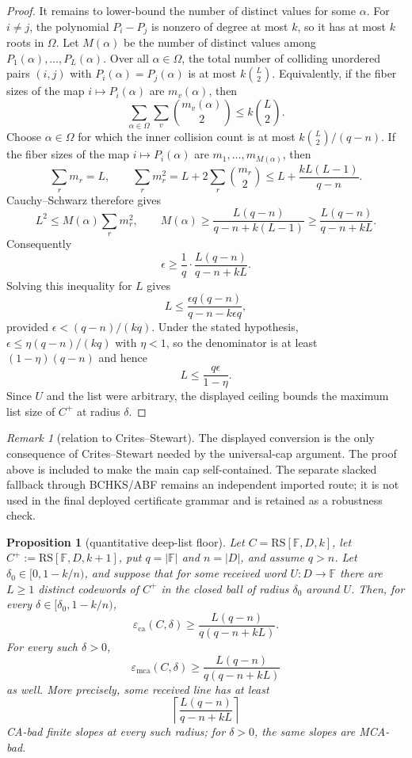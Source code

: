 \documentclass[11pt]{article}
\newtheorem{proposition}[proposition]{Proposition}
\theoremstyle{definition}
\theoremstyle{remark}
\newtheorem{remark}[remark]{Remark}
\newcommand{\F}{\mathbb{F}}
\newcommand{\RS}{\mathrm{RS}}
\newcommand{\eca}{\varepsilon_{\mathrm{ca}}}
\newcommand{\emca}{\varepsilon_{\mathrm{mca}}}
\begin{document}
\begin{proof}
It remains to lower-bound the number of distinct values for some
$\alpha$.  For $i\ne j$, the polynomial $P_i-P_j$ is nonzero of degree
at most $k$, so it has at most $k$ roots in $\Omega$.  Let $M(\alpha)$
be the number of distinct values among $P_1(\alpha),\ldots,P_L(\alpha)$.
Over all $\alpha\in\Omega$, the total number of colliding unordered pairs
$(i,j)$ with $P_i(\alpha)=P_j(\alpha)$ is at most $k\binom L2$.
Equivalently, if the fiber sizes of the map $i\mapsto P_i(\alpha)$ are
$m_v(\alpha)$, then
\[
        \sum_{\alpha\in\Omega}\sum_v \binom{m_v(\alpha)}2
        \le k\binom L2 .
\]
Choose $\alpha\in\Omega$ for which the inner collision count is at most
$k\binom L2/(q-n)$.  If the fiber sizes of the map $i\mapsto P_i(\alpha)$ are
$m_1,\ldots,m_{M(\alpha)}$, then
\[
        \sum_r m_r=L,
        \qquad
        \sum_r m_r^2=L+2\sum_r\binom{m_r}{2}
        \le L+\frac{kL(L-1)}{q-n}.
\]
Cauchy--Schwarz therefore gives
\[
        L^2\le M(\alpha)\sum_r m_r^2,
        \qquad
        M(\alpha)\ge
        \frac{L(q-n)}{q-n+k(L-1)}
        \ge
        \frac{L(q-n)}{q-n+kL} .
\]
Consequently
\[
        \epsilon
        \ge
        \frac1q\cdot \frac{L(q-n)}{q-n+kL}.
\]
Solving this inequality for $L$ gives
\[
        L
        \le
        \frac{\epsilon q(q-n)}{q-n-k\epsilon q},
\]
provided $\epsilon<(q-n)/(kq)$.  Under the stated hypothesis,
$\epsilon\le\eta(q-n)/(kq)$ with $\eta<1$, so the denominator is at
least $(1-\eta)(q-n)$ and hence
\[
        L\le \frac{q\epsilon}{1-\eta}.
\]
Since $U$ and the list were arbitrary, the displayed ceiling bounds the
maximum list size of $C^+$ at radius $\delta$.
\end{proof}

\begin{remark}[relation to Crites--Stewart]
The displayed conversion is the only consequence of Crites--Stewart
needed by the universal-cap argument.  The proof above is included to make the main cap
self-contained.  The separate slacked fallback through BCHKS/ABF remains
an independent imported route; it is not used in the final deployed certificate
grammar and is retained as a robustness check.
\end{remark}

\begin{proposition}[quantitative deep-list floor]
\label{prop:quantitative-deep-list-floor}
Let $C=\RS[\F,D,k]$, let $C^+:=\RS[\F,D,k+1]$, put
$q=|\F|$ and $n=|D|$, and assume $q>n$.  Let
$\delta_0\in[0,1-k/n)$, and suppose that for some received word
$U:D\to\F$ there are $L\ge1$ distinct codewords of $C^+$ in the
closed ball of radius $\delta_0$ around $U$.  Then, for every
$\delta\in[\delta_0,1-k/n)$,
\[
        \eca(C,\delta)
        \ge
        \frac{L(q-n)}{q(q-n+kL)} .
\]
For every such $\delta>0$,
\[
        \emca(C,\delta)
        \ge
        \frac{L(q-n)}{q(q-n+kL)}
\]
as well.  More precisely, some received line has at least
\[
        \left\lceil\frac{L(q-n)}{q-n+kL}\right\rceil
\]
CA-bad finite slopes at every such radius; for $\delta>0$, the same slopes are
MCA-bad.
\end{proposition}
\end{document}
